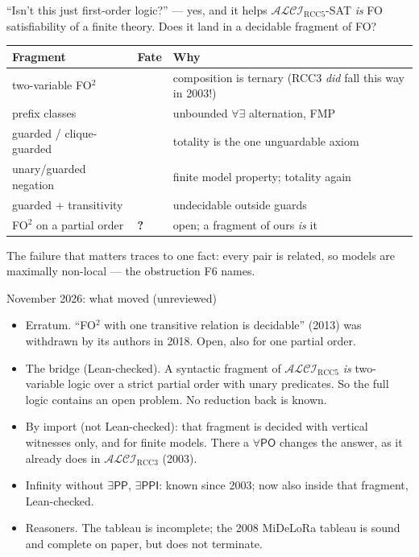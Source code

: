 \documentclass[aspectratio=169,11pt]{beamer}
\newcommand{\xmark}{\textcolor{openc}{\raisebox{.5pt}{$\times$}}}
\newcommand{\ALCIRCC}[1]{\mathcal{ALCI}_{\mathrm{RCC#1}}}
\newcommand{\PO}{\mathsf{PO}}
\newcommand{\PP}{\mathsf{PP}}
\newcommand{\PPI}{\mathsf{PPI}}
\begin{document}
\begin{frame}{``Isn't this just first-order logic?'' --- yes, and it helps}
$\ALCIRCC{5}$-SAT \emph{is} FO satisfiability of a finite theory. Does it
land in a \alert{decidable fragment} of FO?
\begin{center}
\small
\begin{tabular}{lll}
\toprule
Fragment & Fate & Why\\
\midrule
two-variable FO$^2$ & \xmark & composition is ternary
   \hfill {\footnotesize(RCC3 \emph{did} fall this way in 2003!)}\\
prefix classes & \xmark & unbounded $\forall\exists$ alternation, FMP\\
guarded / clique-guarded & \xmark & \alert{totality} is the one unguardable axiom\\
unary/guarded negation & \xmark & finite model property; totality again\\
guarded + transitivity & \xmark & undecidable outside guards\\
FO$^2$ on a partial order & \textbf{?} & \alert{open}; a fragment of ours \emph{is} it\\
\bottomrule
\end{tabular}
\end{center}
\vfill
The failure that matters traces to one fact: \alert{every pair is related},
so models are maximally non-local --- the obstruction F6 names.
\end{frame}

\begin{frame}{November 2026: what moved (unreviewed)}
\begin{itemize}
  \item \alert{Erratum.} ``FO$^2$ with one transitive relation is decidable''
        (2013) was withdrawn by its authors in 2018. Open, also for one
        partial order.
  \item \alert{The bridge} (Lean-checked). A syntactic fragment of
        $\ALCIRCC{5}$ \emph{is} two-variable logic over a strict partial
        order with unary predicates. So the full logic contains an open
        problem. No reduction back is known.
  \item \alert{By import} (not Lean-checked): that fragment is decided with
        vertical witnesses only, and for finite models. There a $\forall\PO$
        changes the answer, as it already does in $\ALCIRCC3$ (2003).
  \item \alert{Infinity without $\exists\PP$, $\exists\PPI$}: known since
        2003; now also inside that fragment, Lean-checked.
  \item \alert{Reasoners.} The tableau is incomplete; the 2008 MiDeLoRa
        tableau is sound and complete on paper, but does not terminate.
\end{itemize}
\end{frame}
\end{document}
